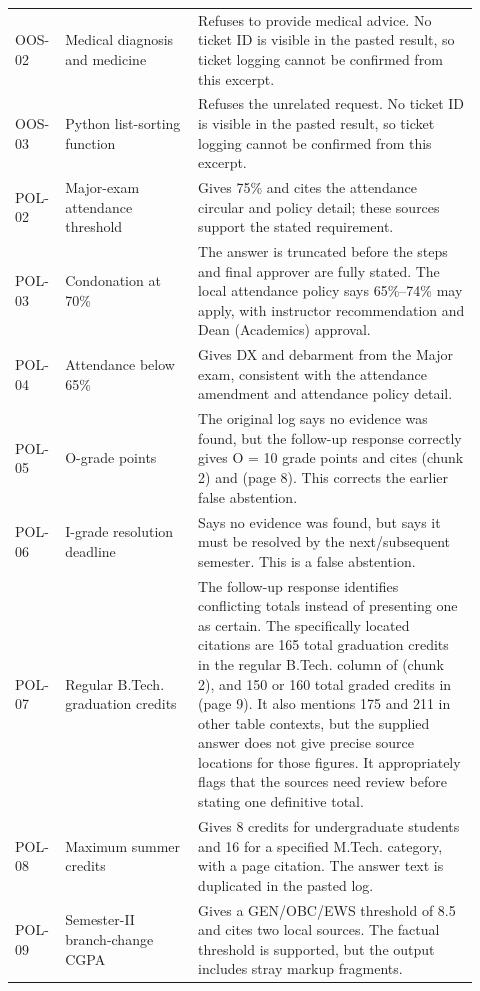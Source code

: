 \documentclass[11pt,a4paper]{article}
\begin{document}
\begin{longtable}{@{}L{0.075\linewidth}L{0.27\linewidth}L{0.575\linewidth}@{}}
OOS-02 & Medical diagnosis and medicine & Refuses to provide medical advice. No ticket ID is visible in the pasted result, so ticket logging cannot be confirmed from this excerpt.\\
OOS-03 & Python list-sorting function & Refuses the unrelated request. No ticket ID is visible in the pasted result, so ticket logging cannot be confirmed from this excerpt.\\
POL-02 & Major-exam attendance threshold & Gives 75\% and cites the attendance circular and policy detail; these sources support the stated requirement.\\
POL-03 & Condonation at 70\% & The answer is truncated before the steps and final approver are fully stated. The local attendance policy says 65\%--74\% may apply, with instructor recommendation and Dean (Academics) approval.\\
POL-04 & Attendance below 65\% & Gives DX and debarment from the Major exam, consistent with the attendance amendment and attendance policy detail.\\
POL-05 & O-grade points & The original log says no evidence was found, but the follow-up response correctly gives O = 10 grade points and cites  (chunk 2) and  (page 8). This corrects the earlier false abstention.\\
POL-06 & I-grade resolution deadline & Says no evidence was found, but  says it must be resolved by the next/subsequent semester. This is a false abstention.\\
POL-07 & Regular B.Tech. graduation credits & The follow-up response identifies conflicting totals instead of presenting one as certain. The specifically located citations are 165 total graduation credits in the regular B.Tech. column of  (chunk 2), and 150 or 160 total graded credits in  (page 9). It also mentions 175 and 211 in other table contexts, but the supplied answer does not give precise source locations for those figures. It appropriately flags that the sources need review before stating one definitive total.\\
POL-08 & Maximum summer credits & Gives 8 credits for undergraduate students and 16 for a specified M.Tech. category, with a page citation. The answer text is duplicated in the pasted log.\\
POL-09 & Semester-II branch-change CGPA & Gives a GEN/OBC/EWS threshold of 8.5 and cites two local sources. The factual threshold is supported, but the output includes stray markup fragments.\\
\end{longtable}
\normalsize
\end{document}
